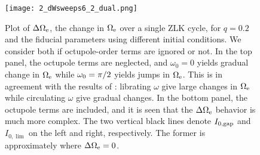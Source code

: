 \documentclass[
        fleqn,
        usenatbib,
    ]{mnras}
\newlength{\colummwidth}
\begin{document}
\begin{figure}
    \centering
    \texttt{[image: 2\_dWsweeps6\_2\_dual.png]}
    \caption{Plot of $\Delta \Omega_{\rm e}$, the change in $\Omega_{\rm e}$
    over a single ZLK cycle, for $q = 0.2$ and the fiducial parameters using
    different initial conditions. We consider both if octupole-order terms are
    ignored or not. In the top panel, the octupole terms are neglected, and
    $\omega_0 = 0$ yields gradual change in $\Omega_{\rm e}$ while $\omega_{\rm
    0} = \pi / 2$ yields jumps in $\Omega_{\rm e}$. This is in agreement with
    the results of \citet{katz2011long}: librating $\omega$ give large changes
    in $\Omega_{\rm e}$ while circulating $\omega$ give gradual changes. In the
    bottom panel, the octupole terms are included, and it is seen that the
    $\Delta \Omega_{\rm e}$ behavior is much more complex. The two vertical
    black lines denote $I_{\rm 0, gap}$ and $I_{0, \lim}$ on the left and right,
    respectively. The former is approximately where $\Delta \Omega_{\rm e} =
    0$.}\label{fig:dW}
\end{figure}

\label{lastpage} %
\end{document}
